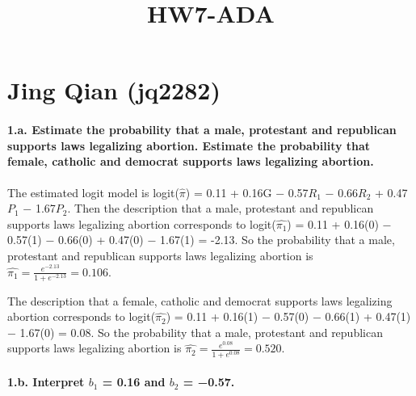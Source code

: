 \documentclass[]{article}
\title{HW7-ADA}
\author{}
\date{}
\let\oldparagraph\paragraph
\renewcommand{\paragraph}[1]{\oldparagraph{#1}\mbox{}}
\begin{document}
\maketitle

\hypertarget{jing-qian-jq2282}{%
\section{Jing Qian (jq2282)}\label{jing-qian-jq2282}}

\hypertarget{a.-estimate-the-probability-that-a-male-protestant-and-republican-supports-laws-legalizing-abortion.-estimate-the-probability-that-female-catholic-and-democrat-supports-laws-legalizing-abortion.}{%
\paragraph{1.a. Estimate the probability that a male, protestant and
republican supports laws legalizing abortion. Estimate the probability
that female, catholic and democrat supports laws legalizing
abortion.}\label{a.-estimate-the-probability-that-a-male-protestant-and-republican-supports-laws-legalizing-abortion.-estimate-the-probability-that-female-catholic-and-democrat-supports-laws-legalizing-abortion.}}

The estimated logit model is logit(\(\hat{\pi}\)) = 0.11 + 0.16G −
0.57\(R_1\) − 0.66\(R_2\) + 0.47\(P_1\) − 1.67\(P_2\). Then the
description that a male, protestant and republican supports laws
legalizing abortion corresponds to logit(\(\hat{\pi_1}\)) = 0.11 +
0.16(0) − 0.57(1) − 0.66(0) + 0.47(0) − 1.67(1) = -2.13. So the
probability that a male, protestant and republican supports laws
legalizing abortion is
\(\hat{\pi_1} = \frac{e^{-2.13}}{1+e^{-2.13}} = 0.106\).

The description that a female, catholic and democrat supports laws
legalizing abortion corresponds to logit(\(\hat{\pi_2}\)) = 0.11 +
0.16(1) − 0.57(0) − 0.66(1) + 0.47(1) − 1.67(0) = 0.08. So the
probability that a male, protestant and republican supports laws
legalizing abortion is
\(\hat{\pi_2} = \frac{e^{0.08}}{1+e^{0.08}} = 0.520\).

\hypertarget{b.-interpret-b_1-0.16-and-b_2-0.57.}{%
\paragraph{\texorpdfstring{1.b. Interpret \(b_1\) = 0.16 and \(b_2\) =
−0.57.}{1.b. Interpret b\_1 = 0.16 and b\_2 = −0.57.}}\label{b.-interpret-b_1-0.16-and-b_2-0.57.}}
\end{document}
